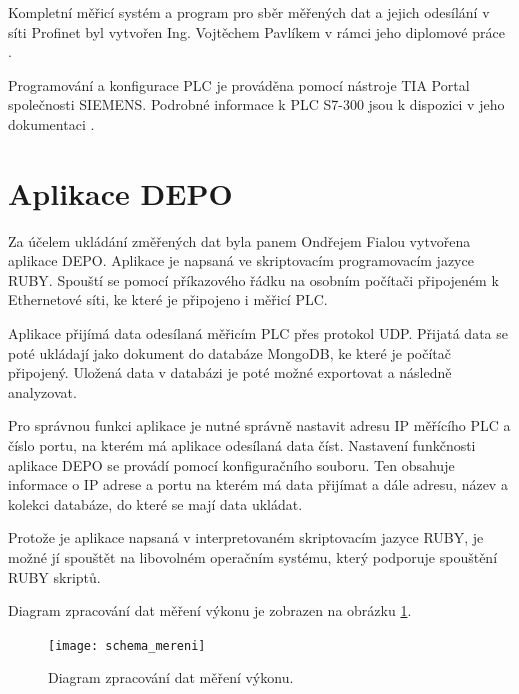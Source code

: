 Kompletní měřicí systém a program pro sběr měřených dat a jejich odesílání v síti Profinet byl vytvořen Ing. Vojtěchem Pavlíkem v rámci jeho diplomové práce \cite{vojtech_pavlik}. 

Programování a konfigurace PLC je prováděna pomocí nástroje TIA Portal společnosti SIEMENS. Podrobné informace k PLC S7-300 jsou k dispozici v jeho dokumentaci \cite{siemens_plc}.  

\section{Aplikace DEPO} 
\label{aplikacedepo}
Za účelem ukládání změřených dat byla panem Ondřejem Fialou vytvořena aplikace DEPO. Aplikace je napsaná ve skriptovacím programovacím jazyce RUBY. Spouští se pomocí příkazového řádku na osobním počítači připojeném k Ethernetové síti, ke které je připojeno i měřicí PLC. 

Aplikace přijímá data odesílaná měřicím PLC přes protokol UDP. Přijatá data se poté ukládají jako dokument do databáze MongoDB, ke které je počítač připojený. Uložená data v databázi je poté možné exportovat a následně analyzovat.

Pro správnou funkci aplikace je nutné správně nastavit adresu IP měřícího PLC a číslo portu, na kterém má aplikace odesílaná data číst. Nastavení funkčnosti aplikace DEPO se provádí pomocí konfiguračního souboru. Ten obsahuje informace o IP adrese a portu na kterém má data přijímat a dále adresu, název a kolekci databáze, do které se mají data ukládat.

Protože je aplikace napsaná v interpretovaném skriptovacím jazyce RUBY, je možné jí spouštět na libovolném operačním systému, který podporuje spouštění RUBY skriptů. 

Diagram zpracování dat měření výkonu je zobrazen na obrázku \ref{schema_mereni_pic}.

\begin{figure}[ht]
\texttt{[image: schema\_mereni]}
\caption{Diagram zpracování dat měření výkonu.}
\label{schema_mereni_pic}
\end{figure}



